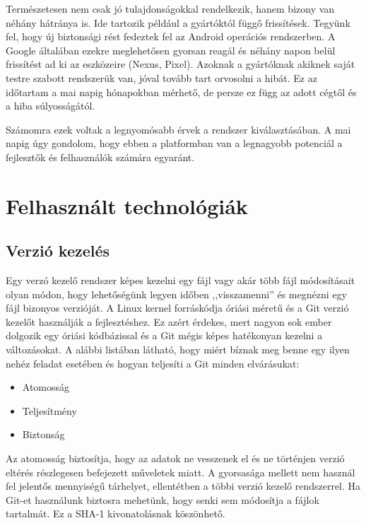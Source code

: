 \documentclass{thesis-ekf}
\theoremstyle{definition}
\theoremstyle{remark}
\begin{document}
Természetesen nem csak jó tulajdonságokkal rendelkezik, hanem bizony van néhány hátránya is.
Ide tartozik például a gyártóktól függő frissítések. Tegyünk fel, hogy új biztonsági rést fedeztek fel az Android operációs rendszerben.
A Google általában ezekre meglehetősen gyorsan reagál és néhány napon belül frissítést ad ki az eszközeire (Nexus, Pixel).
Azoknak a gyártóknak akiknek saját testre szabott rendszerük van, jóval tovább tart orvosolni a hibát.
Ez az időtartam a mai napig hónapokban mérhető, de persze ez függ az adott cégtől és a hiba súlyosságától. 

Számomra ezek voltak a legnyomósabb érvek a rendszer kiválasztásában.
A mai napig úgy gondolom, hogy ebben a platformban van a legnagyobb potenciál a fejlesztők és felhasználók számára egyaránt.

\chapter{Felhasznált technológiák}\label{technologiak}

\section{Verzió kezelés}

Egy verzó kezelő rendszer képes kezelni egy fájl vagy akár több fájl módosításait olyan módon, hogy lehetőségünk legyen időben ,,visszamenni'' és megnézni egy fájl bizonyos verzióját.
A Linux kernel forráskódja óriási méretű és a Git verzió kezelőt használják a fejlesztéshez.
Ez azért érdekes, mert nagyon sok ember dolgozik egy óriási kódbázissal és a Git mégis képes hatékonyan kezelni a változásokat.
A alábbi listában látható, hogy miért bíznak meg benne egy ilyen nehéz feladat esetében és hogyan teljesíti a Git minden elvárásukat:

\begin{itemize}
	\item Atomosság
	\item Teljesítmény
	\item Biztonság
\end{itemize}

Az atomosság biztosítja, hogy az adatok ne vesszenek el és ne történjen verzió eltérés részlegesen befejezett műveletek miatt.
A gyorsasága mellett nem használ fel jelentős mennyiségű tárhelyet, ellentétben a többi verzió kezelő rendszerrel.
Ha Git-et használunk biztosra mehetünk, hogy senki sem módosítja a fájlok tartalmát. Ez a SHA-1 kivonatolásnak köszönhető.\cite{git}
\end{document}
